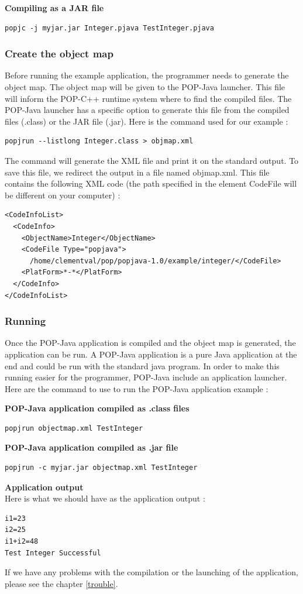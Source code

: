 \textbf{Compiling as a JAR file}
\begin{lstlisting}
popjc -j myjar.jar Integer.pjava TestInteger.pjava
\end{lstlisting}

\subsubsection{Create the object map}
Before running the example application, the programmer needs to generate the object map. The object map will be given to the POP-Java launcher. This file will inform the POP-C++ runtime system where to find the compiled files. The POP-Java launcher has a specific option to generate this file from the compiled files (.class) or the JAR file (.jar). Here is the command used for our example :

\begin{lstlisting}
popjrun --listlong Integer.class > objmap.xml
\end{lstlisting}\s

The command will generate the XML file and print it on the standard output. To save this file, we redirect the output in a file named objmap.xml. This file contains the following XML code (the path specified in the element CodeFile will be different on your computer) : 

\begin{lstlisting}
<CodeInfoList>
  <CodeInfo>
    <ObjectName>Integer</ObjectName>
    <CodeFile Type="popjava">
      /home/clementval/pop/popjava-1.0/example/integer/</CodeFile>
    <PlatForm>*-*</PlatForm>
  </CodeInfo>
</CodeInfoList>
\end{lstlisting}


\subsubsection{Running}
Once the POP-Java application is compiled and the object map is generated, the application can be run. A POP-Java application is a pure Java application at the end and could be run with the standard java program. In order to make this running easier for the programmer, POP-Java include an application launcher. Here are the command to use to run the POP-Java application example : \s

\textbf{POP-Java application compiled as .class files}
\begin{lstlisting}
popjrun objectmap.xml TestInteger
\end{lstlisting}\s

\textbf{POP-Java application compiled as .jar file}
\begin{lstlisting}
popjrun -c myjar.jar objectmap.xml TestInteger
\end{lstlisting}\s

\textbf{Application output}\\
Here is what we should have as the application output : 
\begin{lstlisting}
i1=23
i2=25
i1+i2=48
Test Integer Successful 
\end{lstlisting}\s

If we have any problems with the compilation or the launching of the application, please see the chapter \ref{trouble}.
